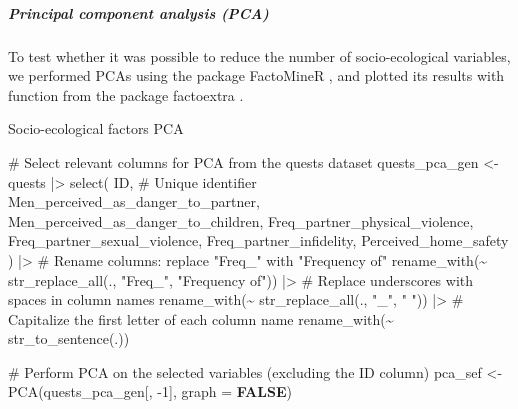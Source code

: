 \documentclass[
  bookmarksnumbered]{article}
\newenvironment{Shaded}{\begin{snugshade}}{\end{snugshade}}
\newcommand{\AttributeTok}[1]{\textcolor[rgb]{0.80,0.80,0.80}{#1}}
\newcommand{\CommentTok}[1]{\textcolor[rgb]{0.50,0.62,0.50}{#1}}
\newcommand{\ConstantTok}[1]{\textcolor[rgb]{0.86,0.64,0.64}{\textbf{#1}}}
\newcommand{\DecValTok}[1]{\textcolor[rgb]{0.86,0.86,0.80}{#1}}
\newcommand{\FunctionTok}[1]{\textcolor[rgb]{0.94,0.94,0.56}{#1}}
\newcommand{\NormalTok}[1]{\textcolor[rgb]{0.80,0.80,0.80}{#1}}
\newcommand{\OtherTok}[1]{\textcolor[rgb]{0.94,0.94,0.56}{#1}}
\newcommand{\SpecialCharTok}[1]{\textcolor[rgb]{0.86,0.64,0.64}{#1}}
\newcommand{\StringTok}[1]{\textcolor[rgb]{0.80,0.58,0.58}{#1}}
\begin{document}
\subparagraph{Principal component analysis (PCA)}\label{principal-component-analysis-pca}

To test whether it was possible to reduce the number of socio-ecological variables, we performed PCAs using the package FactoMineR \autocite{factominercit}, and plotted its results with function from the package factoextra \autocite{factoextracit}.

Socio-ecological factors PCA

\begin{Shaded}
\begin{Highlighting}[]
\CommentTok{\# Select relevant columns for PCA from the \textquotesingle{}quests\textquotesingle{} dataset}
\NormalTok{quests\_pca\_gen }\OtherTok{\textless{}{-}}\NormalTok{ quests }\SpecialCharTok{|\textgreater{}}
  \FunctionTok{select}\NormalTok{(}
\NormalTok{    ID, }\CommentTok{\# Unique identifier}
\NormalTok{    Men\_perceived\_as\_danger\_to\_partner,}
\NormalTok{    Men\_perceived\_as\_danger\_to\_children,}
\NormalTok{    Freq\_partner\_physical\_violence,}
\NormalTok{    Freq\_partner\_sexual\_violence,}
\NormalTok{    Freq\_partner\_infidelity,}
\NormalTok{    Perceived\_home\_safety}
\NormalTok{  ) }\SpecialCharTok{|\textgreater{}}
  \CommentTok{\# Rename columns: replace "Freq\_" with "Frequency of"}
  \FunctionTok{rename\_with}\NormalTok{(}\SpecialCharTok{\textasciitilde{}} \FunctionTok{str\_replace\_all}\NormalTok{(., }\StringTok{"Freq\_"}\NormalTok{, }\StringTok{"Frequency of"}\NormalTok{)) }\SpecialCharTok{|\textgreater{}}
  \CommentTok{\# Replace underscores with spaces in column names}
  \FunctionTok{rename\_with}\NormalTok{(}\SpecialCharTok{\textasciitilde{}} \FunctionTok{str\_replace\_all}\NormalTok{(., }\StringTok{"\_"}\NormalTok{, }\StringTok{" "}\NormalTok{)) }\SpecialCharTok{|\textgreater{}}
  \CommentTok{\# Capitalize the first letter of each column name}
  \FunctionTok{rename\_with}\NormalTok{(}\SpecialCharTok{\textasciitilde{}} \FunctionTok{str\_to\_sentence}\NormalTok{(.))}

\CommentTok{\# Perform PCA on the selected variables (excluding the ID column)}
\NormalTok{pca\_sef }\OtherTok{\textless{}{-}} \FunctionTok{PCA}\NormalTok{(quests\_pca\_gen[, }\SpecialCharTok{{-}}\DecValTok{1}\NormalTok{], }\AttributeTok{graph =} \ConstantTok{FALSE}\NormalTok{)}


\end{Highlighting}
\end{Shaded}
\end{document}
